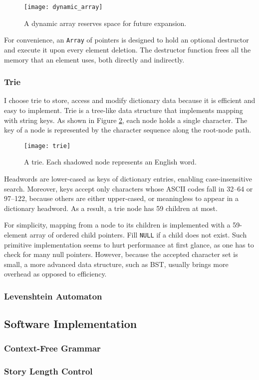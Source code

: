 \documentclass[../main.tex]{subfiles}
\begin{document}
\begin{figure}
	\centering
	\texttt{[image: dynamic\_array]}
	\caption{A dynamic array reserves space for future expansion.}
	\label{figure:dynamic_array}
\end{figure}

For convenience, an \texttt{Array} of pointers is designed to hold an optional destructor and execute it upon every element deletion. The destructor function frees all the memory that an element uses, both directly and indirectly.

\subsubsection{Trie}

I choose trie to store, access and modify dictionary data because it is efficient and easy to implement. Trie is a tree-like data structure that implements mapping with string keys. As shown in Figure \ref{figure:trie}, each node holds a single character. The key of a node is represented by the character sequence along the root-node path.

\begin{figure}
	\centering
	\texttt{[image: trie]}
	\caption{A trie. Each shadowed node represents an English word.}
	\label{figure:trie}
\end{figure}

Headwords are lower-cased as keys of dictionary entries, enabling case-insensitive search. Moreover, keys accept only characters whose ASCII codes fall in 32--64 or 97--122, because others are either upper-cased, or meaningless to appear in a dictionary headword. As a result, a trie node has 59 children at most.

For simplicity, mapping from a node to its children is implemented with a 59-element array of ordered child pointers. Fill \texttt{NULL} if a child does not exist. Such primitive implementation seems to hurt performance at first glance, as one has to check for many null pointers. However, because the accepted character set is small, a more advanced data structure, such as BST, usually brings more overhead as opposed to efficiency.

\subsubsection{Levenshtein Automaton}

\subsection{Software Implementation}

\subsubsection{Context-Free Grammar}

\subsubsection{Story Length Control}
\end{document}
